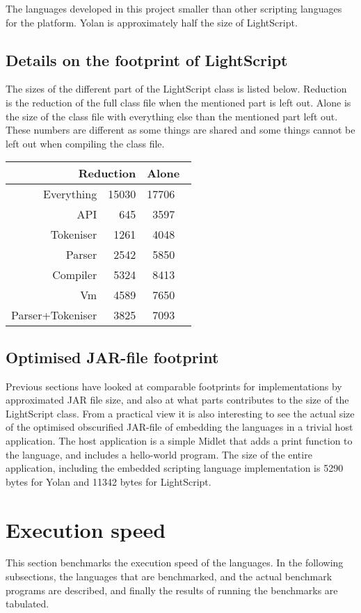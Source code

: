 \documentclass[11pt]{report}
\begin{document}
The languages developed in this project smaller than other scripting languages for the platform. 
Yolan is approximately half the size of LightScript. 

\subsection{Details on the footprint of LightScript}
The sizes of the different part of the LightScript class is listed below.
Reduction is the reduction of the full class file when the mentioned part is left out. Alone is the size of the class file with everything else than the mentioned part left out. These numbers are different as some things are shared and some things cannot be left out when compiling the class file.

\begin{center} \begin{tabular}{|r|r|rl|} \hline
\multicolumn{2}{|r|}{Reduction} & \multicolumn{2}{|l|}{Alone}\\ \hline
Everything & 15030 & 17706 & \\ \hline
API & 645  & 3597  & \\ \hline
Tokeniser & 1261 & 4048 & \\ \hline
Parser & 2542 & 5850 & \\ \hline
Compiler & 5324 & 8413 & \\ \hline
Vm & 4589 & 7650 & \\ \hline
Parser+Tokeniser & 3825 & 7093 & \\ \hline
\end{tabular} \end{center}

\subsection{Optimised JAR-file footprint}
Previous sections have looked at comparable footprints for implementations by approximated JAR file size, and also at what parts contributes to the size of the LightScript class.
From a practical view it is also interesting to see the actual size of the optimised obscurified JAR-file of embedding the languages in a trivial host application.
The host application is a simple Midlet that adds a print function to the language, and includes a hello-world program.
The size of the entire application, including the embedded scripting language implementation is 5290 bytes for Yolan and 11342 bytes for LightScript. 

\section{Execution speed}
This section benchmarks the execution speed of the languages. 
In the following subsections, the languages that are benchmarked, and the actual benchmark programs are described, and finally the results of running the benchmarks are tabulated. 
\end{document}

